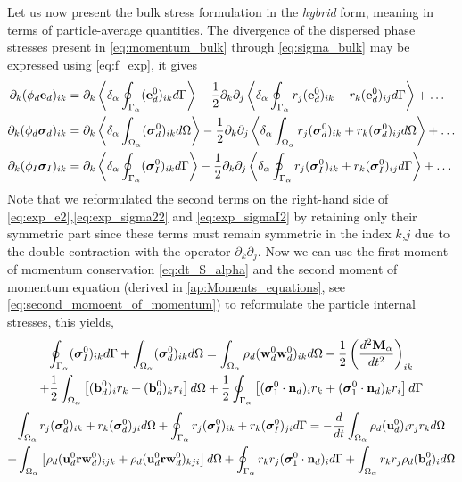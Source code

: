 Let us now present the bulk stress formulation in the \textit{hybrid} form, meaning in terms of particle-average quantities.  
The divergence of the dispersed phase stresses present in \ref{eq:momentum_bulk} through \ref{eq:sigma_bulk} may be expressed using \ref{eq:f_exp}, it gives
\begin{align}
    \label{eq:exp_e2}
    \partial_k (\phi_d \textbf{e}_d)_{ik} 
    &=  \partial_k\pSavg{ (\textbf e_d^0)_{ik} }
        -\frac{1}{2} \partial_k\partial_j \pSavg{ r_j (\textbf e_d^0)_{ik} +r_k (\textbf e_d^0)_{ij} }
        + \ldots  \\
    \label{eq:exp_sigma22}
    \partial_k (\phi_d \bm\sigma_d)_{ik}
    &=  \partial_k\pOavg{ (\bm\sigma_d^0)_{ik}}
    -\frac{1}{2} \partial_k\partial_j
    \pOavg{ r_j(\bm\sigma^0_d)_{ik} + r_k(\bm\sigma^0_d)_{ij}}
    + \ldots  \\
    \label{eq:exp_sigmaI2}
    \partial_k (\phi_I \bm\sigma_I)_{ik} 
    &=  \partial_k\pSavg{ (\bm\sigma_I^0)_{ik} }
        -\frac{1}{2} \partial_k\partial_j \pSavg{ r_j (\bm\sigma_I^0)_{ik} +r_k (\bm\sigma_I^0)_{ij} }
        + \ldots  
\end{align}
Note that we reformulated the second terms on the right-hand side of \ref{eq:exp_e2},\ref{eq:exp_sigma22} and \ref{eq:exp_sigmaI2} by retaining only their symmetric part since these terms must remain symmetric in the index $k$,$j$ due to the double contraction with the operator $\partial_k\partial_j$. 
Now we can use the first moment of momentum conservation \eqref{eq:dt_S_alpha} and the second moment of momentum equation (derived in \ref{ap:Moments_equations}, see \eqref{eq:second_momoent_of_momentum}) to reformulate the particle internal stresses, this yields,  
\begin{multline}
    \intS{ (\bm{\sigma}_I^0)_{ik}}
    +\intO{ (\bm{\sigma}_d^0)_{ik}}
    = 
    \intO{ \rho_d 
    (\textbf{w}_d^0\textbf{w}_d^0  )_{ik}
    }
    -\frac{1}{2}\left(\frac{d^2 \textbf{M}_\alpha}{dt^2} \right)_{ik}\\
    +\frac{1}{2}\intO{ \left[
        (\textbf{b}_d^0)_i
        r_k 
        + (\textbf{b}_d^0)_k
        r_i
    \right]}
    +
    \frac{1}{2}\intS{ \left[
        (\bm{\sigma}_1^0 \cdot \textbf{n}_d)_i r_k
        + (\bm{\sigma}_1^0 \cdot \textbf{n}_d)_k r_i
    \right]
    }
    \label{eq:dt_P1_alpha_bis}
\end{multline}
\begin{multline}
    \intO{ r_{j}(\bm{\sigma}^0_d)_{ik}+r_{k}(\bm{\sigma}^0_d)_{ji}}
    +\intS{ r_{j}(\bm{\sigma}^0_I)_{ik}+r_{k}(\bm{\sigma}_I^0)_{ji}}
    = 
    - \ddt\intO{ \rho_d (\textbf{u}_d^0)_i r_j r_k }
    \\
    + \intO{ \left[
        \rho_d (\textbf{u}^0_d\textbf{r}\textbf{w}_d^0)_{ijk} + \rho_d (\textbf{u}^0_d\textbf{r}\textbf{w}_d^0)_{kji}
    \right]}
    +\intS{  r_{k}r_{j} (\bm{\sigma}_1^0\cdot\textbf{n}_d)_i }
    + \intO{ r_{k}r_{j}  \rho_d (\textbf{b}_d^0)_i } 
    \label{eq:dt_P2_alpha_bis}
\end{multline}
